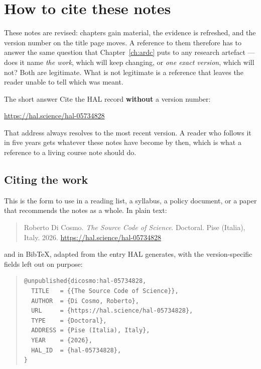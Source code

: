 \chapter{How to cite these notes}
\label{app:citing}

These notes are revised: chapters gain material, the evidence is refreshed, and the version
number on the title page moves. A reference to them therefore has to answer the same question
that Chapter~\ref{ch:ardc} puts to any research artefact --- does it name \emph{the work}, which
will keep changing, or \emph{one exact version}, which will not? Both are legitimate. What is not
legitimate is a reference that leaves the reader unable to tell which was meant.

\begin{callout}{The short answer}
\small
Cite the HAL record \textbf{without} a version number:
\begin{center}
\url{https://hal.science/hal-05734828}
\end{center}
That address always resolves to the most recent version. A reader who follows it in five years
gets whatever these notes have become by then, which is what a reference to a living course note
should do.
\end{callout}

\section{Citing the work}

This is the form to use in a reading list, a syllabus, a policy document, or a paper that
recommends the notes as a whole. In plain text:

\begin{quote}\footnotesize
Roberto Di Cosmo. \emph{The Source Code of Science}. Doctoral. Pise (Italia), Italy.
2026. \url{https://hal.science/hal-05734828}
\end{quote}

\noindent and in Bib\TeX{}, adapted from the entry HAL generates, with the version-specific fields
left out on purpose:

\begin{quote}\footnotesize
\begin{verbatim}
@unpublished{dicosmo:hal-05734828,
  TITLE   = {{The Source Code of Science}},
  AUTHOR  = {Di Cosmo, Roberto},
  URL     = {https://hal.science/hal-05734828},
  TYPE    = {Doctoral},
  ADDRESS = {Pise (Italia), Italy},
  YEAR    = {2026},
  HAL_ID  = {hal-05734828},
}
\end{verbatim}
\end{quote}

